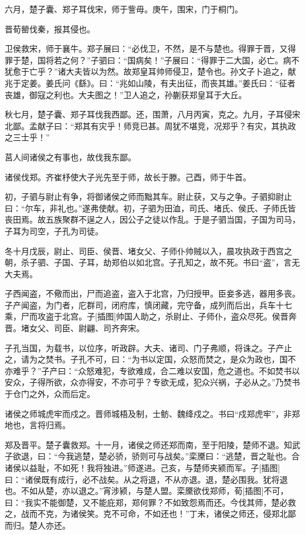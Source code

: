 \documentclass[a4paper,12pt,UTF8,twoside]{ctexbook}
\begin{document}
六月，楚子囊、郑子耳伐宋，师于訾毋。庚午，围宋，门于桐门。

晋荀罃伐秦，报其侵也。

卫侯救宋，师于襄牛。郑子展曰：“必伐卫，不然，是不与楚也。得罪于晋，又得罪于楚，国将若之何？”子驷曰：“国病矣！”子展曰：“得罪于二大国，必亡。病不犹愈于亡乎？”诸大夫皆以为然。故郑皇耳帅师侵卫，楚令也。孙文子卜追之，献兆于定姜。姜氏问《繇》。曰：“兆如山陵，有夫出征，而丧其雄。”姜氏曰：“征者丧雄，御寇之利也。大夫图之！”卫人追之，孙蒯获郑皇耳于大丘。

秋七月，楚子囊、郑子耳伐我西鄙。还，围萧，八月丙寅，克之。九月，子耳侵宋北鄙。孟献子曰：“郑其有灾乎！师竞已甚。周犹不堪竞，况郑乎？有灾，其执政之三士乎！”

莒人间诸侯之有事也，故伐我东鄙。

诸侯伐郑。齐崔杼使大子光先至于师，故长于滕。己酉，师于牛首。

初，子驷与尉止有争，将御诸侯之师而黜其车。尉止获，又与之争。子驷抑尉止曰：“尔车，非礼也。”遂弗使献。初，子驷为田洫，司氏、堵氏、侯氏、子师氏皆丧田焉。故五族聚群不逞之人，因公子之徒以作乱。于是子驷当国，子国为司马，子耳为司空，子孔为司徒。

冬十月戊辰，尉止、司臣、侯晋、堵女父、子师仆帅贼以入，晨攻执政于西宫之朝，杀子驷、子国、子耳，劫郑伯以如北宫。子孔知之，故不死。书曰“盗”，言无大夫焉。

子西闻盗，不儆而出，尸而追盗，盗入于北宫，乃归授甲。臣妾多逃，器用多丧。子产闻盗，为门者，庀群司，闭府库，慎闭藏，完守备，成列而后出，兵车十七乘，尸而攻盗于北宫。子[插图]帅国人助之，杀尉止、子师仆，盗众尽死。侯晋奔晋。堵女父、司臣、尉翩、司齐奔宋。

子孔当国，为载书，以位序，听政辟。大夫、诸司、门子弗顺，将诛之。子产止之，请为之焚书。子孔不可，曰：“为书以定国，众怒而焚之，是众为政也，国不亦难乎？”子产曰：“众怒难犯，专欲难成，合二难以安国，危之道也。不如焚书以安众，子得所欲，众亦得安，不亦可乎？专欲无成，犯众兴祸，子必从之。”乃焚书于仓门之外，众而后定。

诸侯之师城虎牢而戍之。晋师城梧及制，士鲂、魏绛戍之。书曰“戍郑虎牢”，非郑地也，言将归焉。

郑及晋平。楚子囊救郑。十一月，诸侯之师还郑而南，至于阳陵，楚师不退。知武子欲退，曰：“今我逃楚，楚必骄，骄则可与战矣。”栾黡曰：“逃楚，晋之耻也。合诸侯以益耻，不如死！我将独进。”师遂进。己亥，与楚师夹颍而军。子[插图]曰：“诸侯既有成行，必不战矣。从之将退，不从亦退。退，楚必围我。犹将退也。不如从楚，亦以退之。”宵涉颍，与楚人盟。栾黡欲伐郑师，荀[插图]不可，曰：“我实不能御楚，又不能庇郑，郑何罪？不如致怨焉而还。今伐其师，楚必救之，战而不克，为诸侯笑。克不可命，不如还也！”丁未，诸侯之师还，侵郑北鄙而归。楚人亦还。
\end{document}
